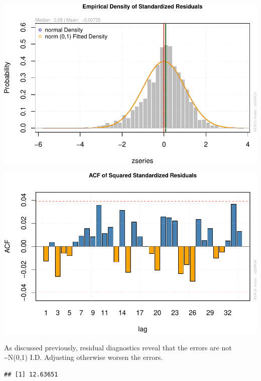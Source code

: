 \documentclass[]{elsarticle} %
\makeatletter
\newenvironment{Shaded}{\begin{snugshade}}{\end{snugshade}}
\newcommand{\KeywordTok}[1]{\textcolor[rgb]{0.13,0.29,0.53}{\textbf{{#1}}}}
\newcommand{\NormalTok}[1]{{#1}}
\def\maxwidth{\ifdim\Gin@nat@width>\linewidth\linewidth
\else\Gin@nat@width\fi}
\let\Oldincludegraphics\includegraphics
\renewcommand{\includegraphics}[1]{\Oldincludegraphics[width=\maxwidth]{#1}}
\makeatother
\begin{document}
\includegraphics{report_files/figure-latex/analysis20df1-1.pdf}

\includegraphics{report_files/figure-latex/analysis2031-1.pdf}

As discussed previously, residual diagnostics reveal that the errors are
not \textasciitilde{}N(0,1) I.D. Adjusting otherwise worsen the errors.

\begin{Shaded}
\end{Shaded}

\begin{verbatim}
## [1] 12.63651
\end{verbatim}

\begin{Shaded}
\end{Shaded}
\end{document}
